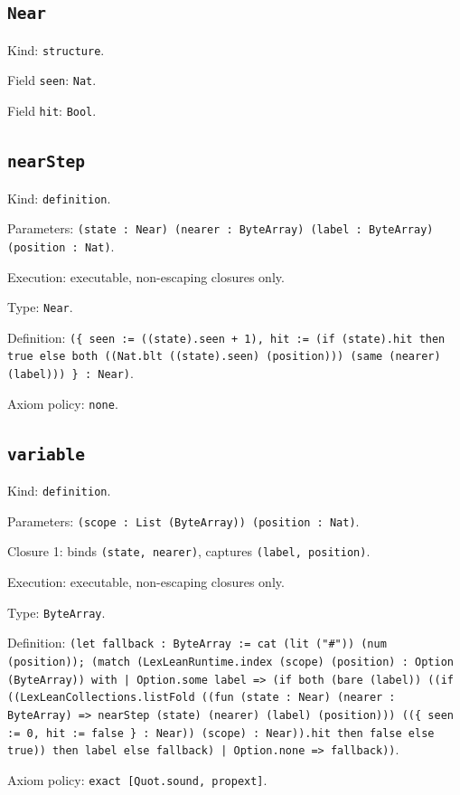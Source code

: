 \documentclass[11pt]{article}
\begin{document}
\subsection*{\texttt{Near}}
\noindent Kind: \texttt{structure}.\par
\noindent Field \texttt{seen}: \texttt{Nat}.\par
\noindent Field \texttt{hit}: \texttt{Bool}.\par
\subsection*{\texttt{nearStep}}
\noindent Kind: \texttt{definition}.\par
\noindent Parameters: \texttt{(state : Near) (nearer : ByteArray) (label : ByteArray) (position : Nat)}.\par
\noindent Execution: executable, non-escaping closures only.\par
\noindent Type: \texttt{Near}.\par
\noindent Definition: \texttt{(\{ seen := ((state).seen + 1), hit := (if (state).hit then true else both ((Nat.blt ((state).seen) (position))) (same (nearer) (label))) \} : Near)}.\par
\noindent Axiom policy: \texttt{none}.\par
\subsection*{\texttt{variable}}
\noindent Kind: \texttt{definition}.\par
\noindent Parameters: \texttt{(scope : List (ByteArray)) (position : Nat)}.\par
\noindent Closure 1: binds \texttt{(state, nearer)}, captures \texttt{(label, position)}.\par
\noindent Execution: executable, non-escaping closures only.\par
\noindent Type: \texttt{ByteArray}.\par
\noindent Definition: \texttt{(let fallback : ByteArray := cat (lit ("\#")) (num (position)); (match (LexLeanRuntime.index (scope) (position) : Option (ByteArray)) with | Option.some label => (if both (bare (label)) ((if ((LexLeanCollections.listFold ((fun (state : Near) (nearer : ByteArray) => nearStep (state) (nearer) (label) (position))) ((\{ seen := 0, hit := false \} : Near)) (scope) : Near)).hit then false else true)) then label else fallback) | Option.none => fallback))}.\par
\noindent Axiom policy: \texttt{exact [Quot.sound, propext]}.\par
\end{document}
